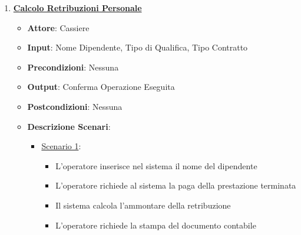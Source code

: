 \begin{enumerate}
    \item \uline {{\bf Calcolo Retribuzioni Personale}}
    \begin{itemize}
        \item {\bf Attore}: Cassiere
        \item {\bf Input}: Nome Dipendente, Tipo di Qualifica, Tipo Contratto 
        \item {\bf Precondizioni}: Nessuna
        \item {\bf Output}: Conferma Operazione Eseguita
        \item {\bf Postcondizioni}: Nessuna
        \item {\bf Descrizione Scenari}:
        \begin{itemize}
            \item \uline{Scenario 1}:
            \begin{itemize}
                \item L'operatore inserisce nel sistema il nome del dipendente
                \item L'operatore richiede al sistema la paga della prestazione terminata
                \item Il sistema calcola l'ammontare della retribuzione
                \item L'operatore richiede la stampa del documento contabile
            \end{itemize}
        \end{itemize}
    \end{itemize}


\end{enumerate}
